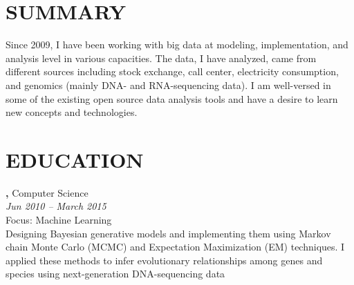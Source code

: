 \documentclass[margin, 10pt]{res} %
\begin{document}
\begin{resume}

 
\section{SUMMARY}
Since 2009, I have been working with big data at modeling, implementation, and analysis level in various capacities. The data, I have analyzed, came from different sources including stock exchange, call center, electricity consumption, and genomics (mainly DNA- and RNA-sequencing data). I am well-versed in some of the existing open source data analysis tools and have a desire to learn new concepts and technologies.




\section{EDUCATION}

{\bf \color{Black}{Doctor of Philosophy},} Computer Science \\
{} \hfill \textit{Jun 2010 -- March 2015} \\
Focus: Machine Learning \\
Designing Bayesian generative models and implementing them using Markov chain Monte Carlo (MCMC) and Expectation Maximization (EM) techniques. I applied these methods to infer evolutionary relationships among genes and species using next-generation DNA-sequencing data %


\end{resume}
\end{document}
